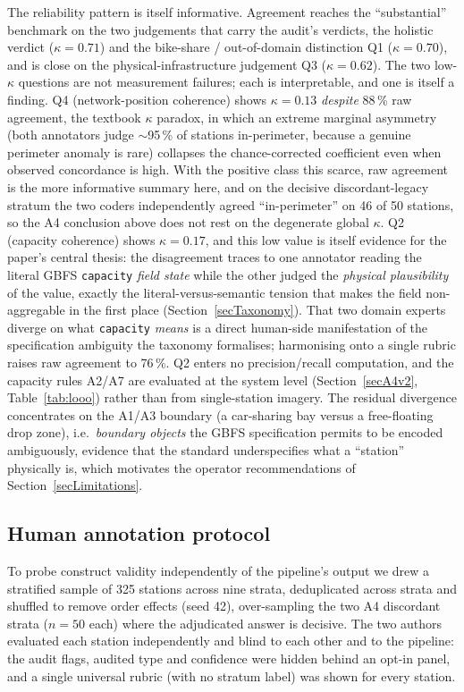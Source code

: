 \documentclass[11pt,a4paper]{article}
\begin{document}
The reliability pattern is itself informative. Agreement reaches the
``substantial'' benchmark on the two judgements that carry the audit's
verdicts, the holistic verdict ($\kappa = 0.71$) and the bike-share /
out-of-domain distinction Q1 ($\kappa = 0.70$), and is close on the
physical-infrastructure judgement Q3 ($\kappa = 0.62$). The two low-$\kappa$
questions are not measurement failures; each is interpretable, and one is
itself a finding. Q4 (network-position coherence) shows $\kappa = 0.13$
\emph{despite} 88\,\% raw agreement, the textbook $\kappa$ paradox, in which
an extreme marginal asymmetry (both annotators judge $\sim$95\,\% of stations
in-perimeter, because a genuine perimeter anomaly is rare) collapses the
chance-corrected coefficient even when observed concordance is high. With the
positive class this scarce, raw agreement is the more informative summary here,
and on the decisive discordant-legacy stratum the two coders independently
agreed ``in-perimeter'' on 46 of 50 stations, so the A4 conclusion above does
not rest on the degenerate global $\kappa$. Q2 (capacity coherence) shows
$\kappa = 0.17$, and this low value is itself evidence for the paper's
central thesis: the disagreement traces to one annotator reading the literal
GBFS \texttt{capacity} \emph{field state} while the other judged the
\emph{physical plausibility} of the value, exactly the
literal-versus-semantic tension that makes the field non-aggregable in the
first place (Section~\ref{secTaxonomy}). That two domain experts diverge on
what \texttt{capacity} \emph{means} is a direct human-side manifestation of
the specification ambiguity the taxonomy formalises; harmonising onto a single
rubric raises raw agreement to 76\,\%. Q2 enters no precision/recall
computation, and the capacity rules A2/A7 are evaluated at the system level
(Section~\ref{secA4v2}, Table~\ref{tab:looo}) rather than from
single-station imagery. The residual divergence concentrates on the
A1/A3 boundary (a car-sharing bay versus a free-floating drop zone), i.e.\
\emph{boundary objects} the GBFS specification permits to be encoded
ambiguously, evidence that the standard underspecifies what a ``station''
physically is, which motivates the operator recommendations of
Section~\ref{secLimitations}.

\subsection{Human annotation protocol}\label{secAnnotation}
To probe construct validity independently of the pipeline's output we drew a
stratified sample of 325 stations across nine strata, deduplicated
across strata and shuffled to remove order effects (seed 42), over-sampling
the two A4 discordant strata ($n=50$ each) where the adjudicated answer is
decisive. The two authors evaluated each station independently and blind to
each other and to the pipeline: the audit flags, audited type and confidence were
hidden behind an opt-in panel, and a single universal rubric (with no
stratum label) was shown for every station.
\end{document}
